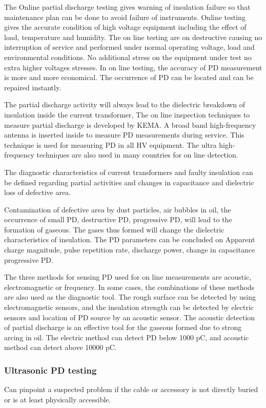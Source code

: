 The Online partial discharge testing gives warning of insulation failure so that maintenance plan can be done to avoid failure of instruments. Online testing gives the accurate condition of high voltage equipment including the effect of load, temperature and humidity. The on line testing are on destructive causing no interruption of service and performed under normal operating voltage, load and environmental conditions. No additional stress on the equipment under test no extra higher voltages stresses. In on line testing, the accuracy of PD measurement is more and more economical. The occurrence of PD can be located and can be repaired instantly.

The partial discharge activity will always lead to the dielectric breakdown of insulation inside the current transformer, The on line inspection techniques to measure partial discharge is developed by KEMA. A broad band high-frequency antenna is inserted inside to measure PD measurements during service. This technique is used for measuring PD in all HV equipment. The ultra high-frequency techniques are also used in many countries for on line detection. 

The diagnostic characteristics of current transformers and faulty insulation can be defined regarding partial activities and changes in capacitance and dielectric loss of defective area.

Contamination of defective area by dust particles, air bubbles in oil, the occurrence of small PD, destructive PD, progressive PD, will lead to the formation of gaseous. The gases thus formed will change the dielectric characteristics of insulation. The PD parameters can be concluded on Apparent charge magnitude, pulse repetition rate, discharge power, change in capacitance progressive PD.
 
The three methods for sensing PD used for on line measurements are acoustic, electromagnetic or frequency. In some cases, the combinations of these methods are 
also used as the diagnostic tool. The rough surface can be detected by using electromagnetic sensors, and the insulation strength can be detected by electric sensors and location of PD source by an acoustic sensor. The acoustic detection of partial discharge is an effective tool for the gaseous formed due to strong arcing in oil. The electric method can detect PD below 1000 pC, and acoustic method can detect above 10000 pC\setlength{\parskip}{0em}.

\subsubsection{Ultrasonic PD testing}
\setlength{\parskip}{0em}
Can pinpoint a suspected problem if the cable or accessory is not directly buried or is at least physically accessible.

